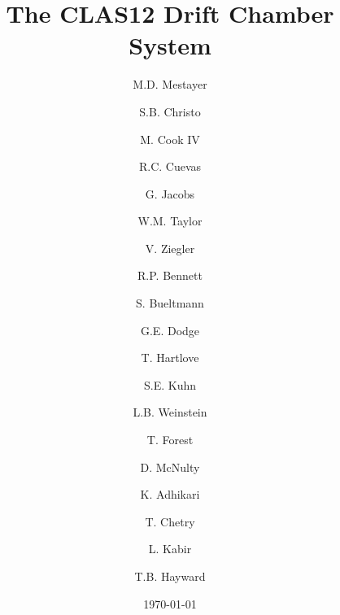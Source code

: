 \documentclass{elsart}
\begin{document}
\begin{frontmatter}
  
\title{The CLAS12 Drift Chamber System}


\author[jlab]{M.D. Mestayer}
\author[jlab]{S.B. Christo}
\author[jlab]{M. Cook IV}
\author[jlab]{R.C. Cuevas}
\author[jlab]{G. Jacobs}
\author[jlab]{W.M. Taylor}
\author[jlab]{V. Ziegler}
\author[odu]{R.P. Bennett}
\author[odu]{S. Bueltmann}
\author[odu]{G.E. Dodge}
\author[odu]{T. Hartlove}
\author[odu]{S.E. Kuhn}
\author[odu]{L.B. Weinstein}
\author[isu]{T. Forest}
\author[isu]{D. McNulty}
\author[msu][hampton]{K. Adhikari}
\author[msu]{T. Chetry}
\author[msu][ucriverside]{L. Kabir}
\author[wm]{T.B. Hayward}
\address[jlab]{Thomas Jefferson National Accelerator Facility, Newport News, VA 23606, USA}
\address[odu]{Old Dominion University}
\address[isu]{Idaho State University}
\address[msu]{Mississippi State University}
\address[wm]{University of William and Mary}
\address[hampton]{Hampton University}
\address[ucriverside]{University of California, Riverside}

\date{\today}





\end{frontmatter}













\end{document}
